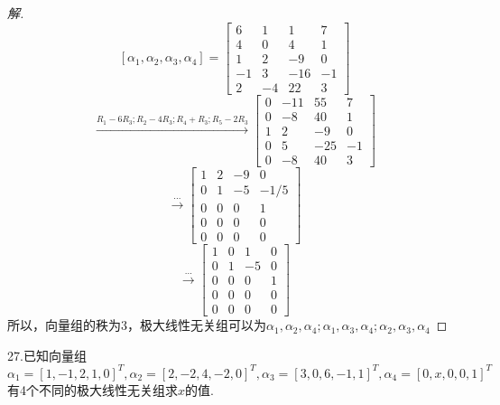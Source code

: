 \documentclass[10pt,a4paper]{report}
\begin{document}
\begin{proof}[解]
	$$
	[\alpha_{1}, \alpha_{2}, \alpha_{3}, \alpha_{4}] = \left[
	\begin{matrix}
	6 & 1 & 1 & 7 \\
	4 & 0 & 4 & 1 \\
	1 & 2 & -9 & 0 \\
	-1 & 3 & -16 & -1\\
	2 & -4 & 22 & 3 
	\end{matrix}
	\right]	
	$$
	$$
	\xrightarrow{R_{1}-6R_{3};R_{2}-4R_{3};R_{4}+R_{3};R_{5}-2R_{3}}
	\left[
	\begin{matrix}
	0 & -11 & 55 & 7 \\
	0 & -8 & 40 & 1 \\
	1 & 2 & -9 & 0 \\
	0 & 5 & -25 & -1\\
	0 & -8 & 40 & 3 
	\end{matrix}
	\right]
	$$
	$$
	\xrightarrow{...}
	\left[
	\begin{matrix}
	1 & 2 & -9 & 0 \\
	0 & 1 & -5 & -1/5 \\
	0 & 0 & 0 & 1 \\
	0 & 0 & 0 & 0\\
	0 & 0 & 0 & 0 
	\end{matrix}
	\right]
	$$
	$$
	\xrightarrow{...}
	\left[
	\begin{matrix}
	1 & 0 & 1 & 0 \\
	0 & 1 & -5 & 0 \\
	0 & 0 & 0 & 1 \\
	0 & 0 & 0 & 0\\
	0 & 0 & 0 & 0 
	\end{matrix}
	\right]
	$$
	所以，向量组的秩为3，极大线性无关组可以为$\alpha_{1}, \alpha_{2}, \alpha_{4};\alpha_{1}, \alpha_{3}, \alpha_{4};\alpha_{2}, \alpha_{3}, \alpha_{4}$
\end{proof}
\noindent 27.已知向量组$\alpha_{1}=[1,-1,2,1,0]^{T}, \alpha_{2}=[2,-2,4,-2,0]^{T}, \alpha_{3}=[3,0,6,-1,1]^{T}, \alpha_{4}=[0,x,0,0,1]^{T}$有4个不同的极大线性无关组求$x$的值.
\end{document}
